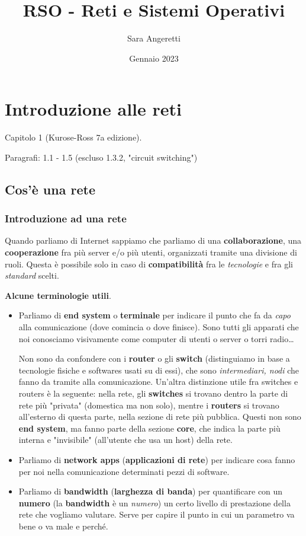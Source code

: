 \documentclass[10pt, a4paper, openany]{book}
\begin{document}
\title{RSO - Reti e Sistemi Operativi}
\author{Sara Angeretti}
\date{Gennaio 2023}

\maketitle
\tableofcontents


\chapter{Introduzione alle reti}
Capitolo 1 (Kurose-Ross 7a edizione).

\noindent Paragrafi: 1.1 - 1.5 (escluso 1.3.2, "circuit switching")

\section{Cos'è una rete}
\subsection{Introduzione ad una rete}
Quando parliamo di Internet sappiamo che parliamo di una \textbf{collaborazione}, una \textbf{cooperazione} fra più server e/o più utenti, organizzati tramite una divisione di ruoli. Questa è possibile solo in caso di \textbf{compatibilità} fra le \textit{tecnologie} e fra gli \textit{standard} scelti.

\vspace{0.5cm}
\noindent \textbf{Alcune terminologie utili}.
\begin{itemize}
    \item Parliamo di \textbf{end system} o \textbf{terminale} per indicare il punto che fa da \textit{capo} alla comunicazione (dove comincia o dove finisce). Sono tutti gli apparati che noi conosciamo visivamente come computer di utenti o server o torri radio\dots
    
    \noindent Non sono da confondere con i \textbf{router} o gli \textbf{switch} (distinguiamo in base a tecnologie fisiche e softwares usati su di essi), che sono \textit{intermediari, nodi} che fanno da tramite alla comunicazione. Un'altra distinzione utile fra switches e routers è la seguente: nella rete, gli \textbf{switches} si trovano dentro la parte di rete più "privata" (domestica ma non solo), mentre i \textbf{routers} si trovano all'esterno di questa parte, nella sezione di rete più pubblica.
    \noindent Questi non sono \textbf{end system}, ma fanno parte della sezione \textbf{core}, che indica la parte più interna e "invisibile" (all'utente che usa un host) della rete.
    \item Parliamo di \textbf{network apps} (\textbf{applicazioni di rete}) per indicare cosa fanno per noi nella comunicazione determinati pezzi di software.
    \item Parliamo di \textbf{bandwidth} (\textbf{larghezza di banda}) per quantificare con un \textbf{numero} (la \textbf{bandwidth} è un \textit{numero}) un certo livello di prestazione della rete che vogliamo valutare. Serve per capire il punto in cui un parametro va bene o va male e perché.
\end{itemize}
\end{document}
